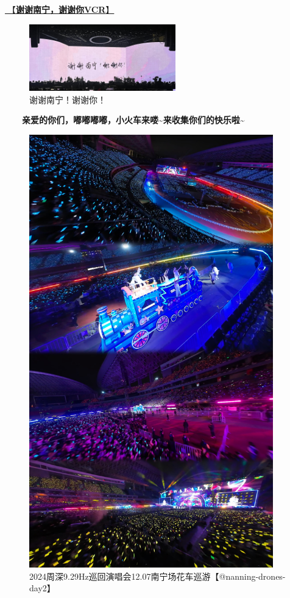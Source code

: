 \documentclass[]{ctexbook}
\begin{document}
\hyperref[thank-you-vcr]{🎥【\textbf{谢谢南宁，谢谢你VCR}】}

\begin{figure}

{\centering \includegraphics[width=180pt]{img/nanning20241207/thank-nanning} 

}

\caption{谢谢南宁！谢谢你！}\label{fig:unnamed-chunk-138}
\end{figure}

  \textbf{亲爱的你们，嘟嘟嘟嘟，小火车来喽\textasciitilde 来收集你们的快乐啦\textasciitilde{}}

\begin{figure}

{\centering \includegraphics[width=300pt]{img/nanning20241207/002} 

}

\caption{2024周深9.29Hz巡回演唱会12.07南宁场花车巡游【@nanning-drones-day2】}\label{fig:unnamed-chunk-139}
\end{figure}
\end{document}
